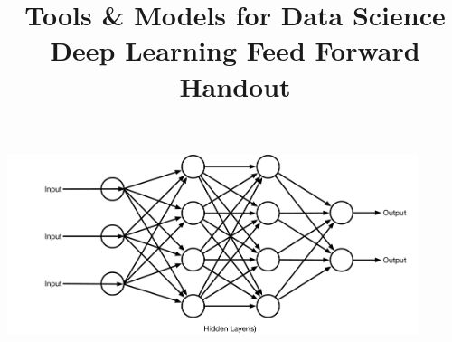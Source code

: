 \documentclass{article}
\title{Tools \& Models for Data Science \\ Deep Learning Feed Forward Handout}
\date{}
\begin{document}
\maketitle
\thispagestyle{fancy}

\includegraphics[width=0.9\textwidth]{lectFF/nn.pdf}
\end{document}
